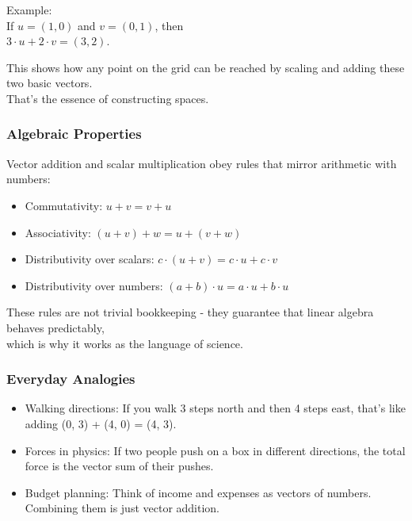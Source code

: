 \documentclass[
  letterpaper,
  DIV=11,
  numbers=noendperiod]{scrreprt}
\providecommand{\tightlist}{%
  \setlength{\itemsep}{0pt}\setlength{\parskip}{0pt}}
\begin{document}
Example:\\
If \(u = (1, 0)\) and \(v = (0, 1)\), then\\
\(3 \cdot u + 2 \cdot v = (3, 2)\).

This shows how any point on the grid can be reached by scaling and
adding these two basic vectors.\\
That's the essence of constructing spaces.

\subsubsection{Algebraic Properties}\label{algebraic-properties}

Vector addition and scalar multiplication obey rules that mirror
arithmetic with numbers:

\begin{itemize}
\tightlist
\item
  Commutativity: \(u + v = v + u\)\\
\item
  Associativity: \((u + v) + w = u + (v + w)\)\\
\item
  Distributivity over scalars:
  \(c \cdot (u + v) = c \cdot u + c \cdot v\)\\
\item
  Distributivity over numbers:
  \((a + b) \cdot u = a \cdot u + b \cdot u\)
\end{itemize}

These rules are not trivial bookkeeping - they guarantee that linear
algebra behaves predictably,\\
which is why it works as the language of science.

\subsubsection{Everyday Analogies}\label{everyday-analogies}

\begin{itemize}
\tightlist
\item
  Walking directions: If you walk 3 steps north and then 4 steps east,
  that's like adding (0, 3) + (4, 0) = (4, 3).
\item
  Forces in physics: If two people push on a box in different
  directions, the total force is the vector sum of their pushes.
\item
  Budget planning: Think of income and expenses as vectors of numbers.
  Combining them is just vector addition.
\end{itemize}
\end{document}
